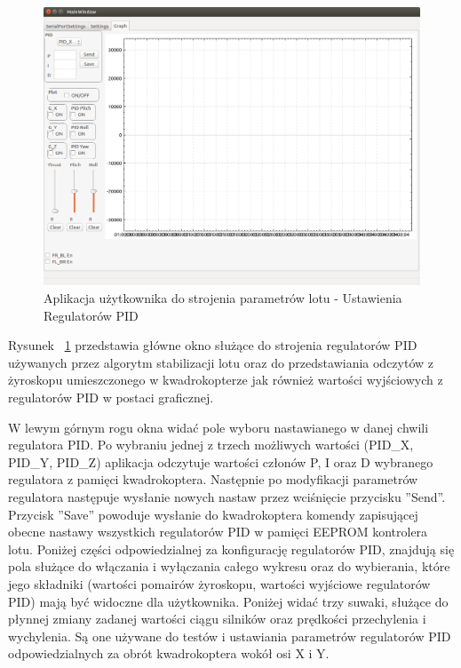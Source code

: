 \begin{figure}[H]
	\centering
	\includegraphics[scale=0.4]{Pictures/QuadroTune/QuadroTuneGraph.png}
	\caption[Aplikacja użytkownika do strojenia parametrów lotu - Ustawienia regulatorów PID]{Aplikacja użytkownika do strojenia parametrów lotu - Ustawienia Regulatorów PID}
	\label{fig:QuadroTune_screen3}
\end{figure}

Rysunek ~\ref{fig:QuadroTune_screen3} przedstawia główne okno służące do strojenia regulatorów PID używanych przez algorytm stabilizacji lotu oraz do przedstawiania odczytów z żyroskopu umieszczonego w kwadrokopterze jak również wartości wyjściowych z regulatorów PID w postaci graficznej.

W lewym górnym rogu okna widać pole wyboru nastawianego w danej chwili regulatora PID. Po wybraniu jednej z trzech możliwych wartości (PID\_X, PID\_Y, PID\_Z) aplikacja odczytuje wartości członów P, I oraz D wybranego regulatora z pamięci kwadrokoptera. Następnie po modyfikacji parametrów regulatora następuje wysłanie nowych nastaw przez wciśnięcie przycisku ''Send''. Przycisk ''Save'' powoduje wysłanie do kwadrokoptera komendy zapisującej obecne nastawy wszystkich regulatorów PID w pamięci EEPROM kontrolera lotu. Poniżej części odpowiedzialnej za konfigurację regulatorów PID, znajdują się pola służące do włączania i wyłączania całego wykresu oraz do wybierania, które jego składniki (wartości pomairów żyroskopu, wartości wyjściowe regulatorów PID) mają być widoczne dla użytkownika. Poniżej widać trzy suwaki, służące do płynnej zmiany zadanej wartości ciągu silników oraz prędkości przechylenia i wychylenia. Są one używane do testów i ustawiania parametrów regulatorów PID odpowiedzialnych za obrót kwadrokoptera wokół osi X i Y. 



